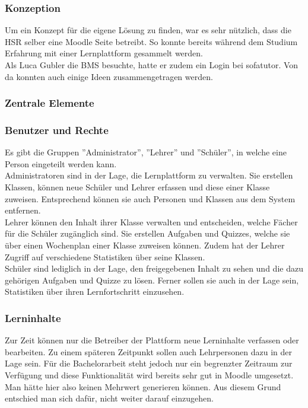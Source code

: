 \subsubsection{Konzeption}
Um ein Konzept für die eigene Lösung zu finden, war es sehr nützlich, dass die HSR selber eine Moodle Seite betreibt. So konnte bereits während dem Studium Erfahrung mit einer Lernplattform gesammelt werden. \\

\noindent Als Luca Gubler die BMS besuchte, hatte er zudem ein Login bei sofatutor. Von da konnten auch einige Ideen zusammengetragen werden. 


\subsubsection{Zentrale Elemente}
\subsubsection*{Benutzer und Rechte}
Es gibt die Gruppen ''Administrator'', ''Lehrer'' und ''Schüler'', in welche eine Person eingeteilt werden kann. \\

\noindent Administratoren sind in der Lage, die Lernplattform zu verwalten. Sie erstellen Klassen, können neue Schüler und Lehrer erfassen und diese einer Klasse zuweisen. Entsprechend können sie auch Personen und Klassen aus dem System entfernen. \\

\noindent Lehrer können den Inhalt ihrer Klasse verwalten und entscheiden, welche Fächer für die Schüler zugänglich sind. Sie erstellen Aufgaben und Quizzes, welche sie über einen Wochenplan einer Klasse zuweisen können. Zudem hat der Lehrer Zugriff auf verschiedene Statistiken über seine Klassen. \\

\noindent Schüler sind lediglich in der Lage, den freigegebenen Inhalt zu sehen und die dazu gehörigen Aufgaben und Quizze zu lösen. Ferner sollen sie auch in der Lage sein, Statistiken über ihren Lernfortschritt einzusehen.

\subsubsection*{Lerninhalte}
Zur Zeit können nur die Betreiber der Plattform neue Lerninhalte verfassen oder bearbeiten. Zu einem späteren Zeitpunkt sollen auch Lehrpersonen dazu in der Lage sein. Für die Bachelorarbeit steht jedoch nur ein begrenzter Zeitraum zur Verfügung und diese Funktionalität wird bereits sehr gut in Moodle umgesetzt. Man hätte hier also keinen Mehrwert generieren können. Aus diesem Grund entschied man sich dafür, nicht weiter darauf einzugehen. 

